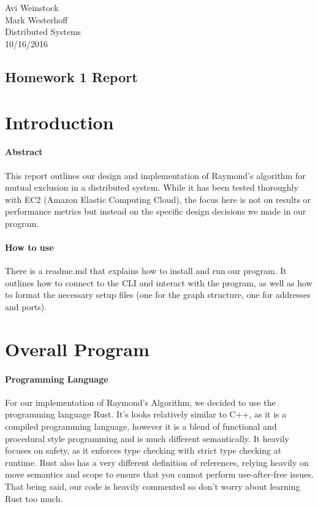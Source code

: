 \documentclass{article}
\begin{document}
\section*{}
Avi Weinstock \\
Mark Westerhoff \\
Distributed Systems\\
10/16/2016

\begin{center}
	\section*{Homework 1 Report}
\end{center}

\section*{Introduction}
\paragraph*{Abstract}
This report outlines our design and implementation of Raymond's algorithm for mutual exclusion in a distributed system. While it has been tested thoroughly with EC2 (Amazon Elastic Computing Cloud), the focus here is not on results or performance metrics but instead on the specific design decisions we made in our program.

\paragraph*{How to use}
There is a readme.md that explains how to install and run our program. It outlines how to connect to the CLI and interact with the program, as well as how to format the necessary setup files (one for the graph structure, one for addresses and ports).

\section*{Overall Program}
\paragraph*{Programming Language}
For our implementation of Raymond's Algorithm, we decided to use the programming language Rust. It's looks relatively similar to C++, as it is a compiled programming language, however it is a blend of functional and procedural style programming and is much different semantically. It heavily focuses on safety, as it enforces type checking with strict type checking at runtime. Rust also has a very different definition of references, relying heavily on move semantics and scope to ensure that you cannot perform use-after-free issues. That being said, our code is heavily commented so don't worry about learning Rust too much.
\end{document}
